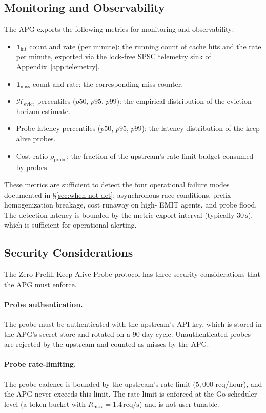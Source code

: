\subsection{Monitoring and Observability}

The APG exports the following metrics for monitoring and observability:

\begin{itemize}
\item $\mathbf{1}_{\text{hit}}$ count and rate (per minute): the
running count of cache hits and the rate per minute, exported via the
lock-free SPSC telemetry sink of Appendix~\ref{app:telemetry}.
\item $\mathbf{1}_{\text{miss}}$ count and rate: the corresponding
miss counter.
\item $\mathcal{H}_{\text{evict}}$ percentiles ($p50$, $p95$, $p99$):
the empirical distribution of the eviction horizon estimate.
\item Probe latency percentiles ($p50$, $p95$, $p99$): the latency
distribution of the keep-alive probes.
\item Cost ratio $\rho_{\text{probe}}$: the fraction of the upstream's
rate-limit budget consumed by probes.
\end{itemize}

These metrics are sufficient to detect the four operational failure
modes documented in \S\ref{sec:when-not-det}: asynchronous race
conditions, prefix homogenization breakage, cost runaway on high-
EMIT agents, and probe flood. The detection latency is bounded by
the metric export interval (typically $30\,\text{s}$), which is
sufficient for operational alerting.

\subsection{Security Considerations}

The Zero-Prefill Keep-Alive Probe protocol has three security
considerations that the APG must enforce.

\paragraph{Probe authentication.}
The probe must be authenticated with the upstream's API key, which is
stored in the APG's secret store and rotated on a $90$-day cycle.
Unauthenticated probes are rejected by the upstream and counted as
misses by the APG.

\paragraph{Probe rate-limiting.}
The probe cadence is bounded by the upstream's rate limit
($5{,}000$-req/hour), and the APG never exceeds this limit. The rate
limit is enforced at the Go scheduler level (a token bucket with
$R_{\max} = 1.4\,\text{req/s}$) and is not user-tunable.

